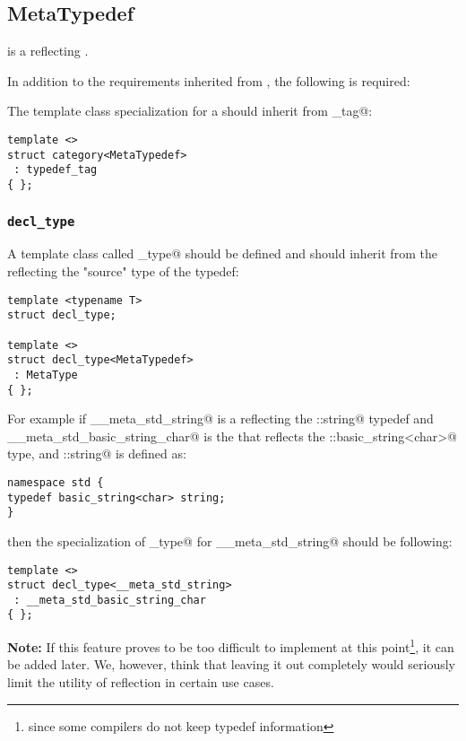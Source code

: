 \subsection{MetaTypedef}
\label{concept-MetaTypedef}

 is a  reflecting \verb@typedef@s.

In addition to the requirements inherited from , the following is required:

The \verb@category@ template class specialization for a  should
inherit from \verb@typedef_tag@:

\begin{verbatim}
template <>
struct category<MetaTypedef>
 : typedef_tag
{ };
\end{verbatim}

\subsubsection{\texttt{decl\_type}}

A template class called \verb@decl_type@ should be defined and should inherit from the 
reflecting the "source" type of the typedef:

\begin{verbatim}
template <typename T>
struct decl_type;

template <>
struct decl_type<MetaTypedef>
 : MetaType
{ };
\end{verbatim}

For example if \verb@__meta_std_string@ is a  reflecting the \verb@std::string@
typedef and \verb@__meta_std_basic_string_char@ is the  that reflects
the \verb@std::basic_string<char>@ type, and \verb@std::string@ is defined as:

\begin{verbatim}
namespace std {
typedef basic_string<char> string;
}
\end{verbatim}

then the specialization of \verb@decl_type@ for \verb@__meta_std_string@ should be following:

\begin{verbatim}
template <>
struct decl_type<__meta_std_string>
 : __meta_std_basic_string_char
{ };
\end{verbatim}

\textbf{Note:} If this feature proves to be too difficult to implement 
at this point\footnote{since some compilers do not keep typedef information},
it can be added later. We, however, think that leaving it out completely would
seriously limit the utility of reflection in certain use cases.
